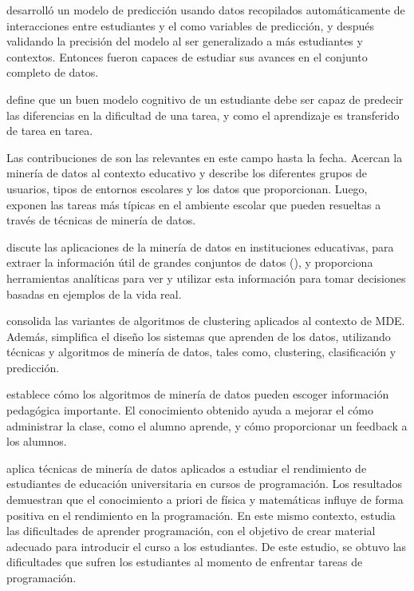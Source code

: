 \cite{baker2010data} desarrolló un modelo de predicción usando datos recopilados automáticamente de interacciones entre estudiantes y el  como variables de predicción, y después validando la precisión del modelo al ser generalizado a más estudiantes y contextos. Entonces fueron capaces de estudiar sus avances en el conjunto completo de datos.

\cite{koedinger2015data} define que un buen modelo cognitivo de un estudiante debe ser capaz de predecir las diferencias en la dificultad de una tarea, y como el aprendizaje es transferido de tarea en tarea.

Las contribuciones de \cite{romero2010educational} son las relevantes en este campo hasta la fecha. Acercan la minería de datos al contexto educativo y describe los diferentes grupos de usuarios, tipos de entornos escolares y los datos que proporcionan. Luego, exponen las tareas más típicas en el ambiente escolar que pueden resueltas a través de técnicas de minería de datos.

\cite{sarala2015empirical} discute las aplicaciones de la minería de datos en instituciones educativas, para extraer la información útil de grandes conjuntos de datos (), y proporciona herramientas analíticas para ver y utilizar esta información para tomar decisiones basadas en ejemplos de la vida real.

\cite{dutt2015clustering} consolida las variantes de algoritmos de clustering aplicados al contexto de MDE. Además, simplifica el diseño los sistemas que aprenden de los datos, utilizando técnicas y algoritmos de minería de datos, tales como, clustering, clasificación y predicción.  

\cite{merceron2005educational} establece cómo los algoritmos de minería de datos pueden escoger información pedagógica importante. El conocimiento obtenido ayuda a mejorar el cómo administrar la clase, como el alumno aprende, y cómo proporcionar un feedback a los alumnos. 

\cite{akinola2012data} aplica técnicas de minería de datos aplicados a estudiar el rendimiento de estudiantes de educación universitaria en cursos de programación. Los resultados demuestran que el conocimiento a priori de física y matemáticas influye de forma positiva en el rendimiento en la programación. En este mismo contexto, \cite{lahtinen2005study} estudia las dificultades de aprender programación, con el objetivo de crear material adecuado para introducir el curso a los estudiantes. De este estudio, se obtuvo las dificultades que sufren los estudiantes al momento de enfrentar tareas de programación.

